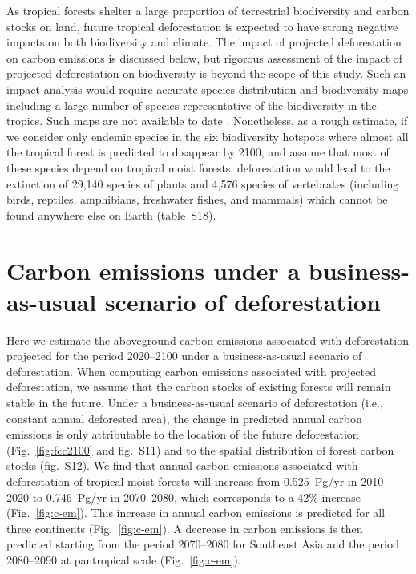 \documentclass[
  12pt,
]{article}
\begin{document}
As tropical forests shelter a large proportion of terrestrial biodiversity and carbon stocks on land, future tropical deforestation is expected to have strong negative impacts on both biodiversity and climate. The impact of projected deforestation on carbon emissions is discussed below, but rigorous assessment of the impact of projected deforestation on biodiversity is beyond the scope of this study. Such an impact analysis would require accurate species distribution and biodiversity maps including a large number of species representative of the biodiversity in the tropics. Such maps are not available to date \citep{Pimm2014}. Nonetheless, as a rough estimate, if we consider only endemic species \citep{Mittermeier2011} in the six biodiversity hotspots where almost all the tropical forest is predicted to disappear by 2100, and assume that most of these species depend on tropical moist forests, deforestation would lead to the extinction of 29,140 species of plants and 4,576 species of vertebrates (including birds, reptiles, amphibians, freshwater fishes, and mammals) which cannot be found anywhere else on Earth (table~S18).

\hypertarget{carbon-emissions-under-a-business-as-usual-scenario-of-deforestation}{%
\section{Carbon emissions under a business-as-usual scenario of deforestation}\label{carbon-emissions-under-a-business-as-usual-scenario-of-deforestation}}

Here we estimate the aboveground carbon emissions associated with deforestation projected for the period 2020--2100 under a business-as-usual scenario of deforestation. When computing carbon emissions associated with projected deforestation, we assume that the carbon stocks of existing forests will remain stable in the future. Under a business-as-usual scenario of deforestation (i.e., constant annual deforested area), the change in predicted annual carbon emissions is only attributable to the location of the future deforestation (Fig.~\ref{fig:fcc2100} and fig.~S11) and to the spatial distribution of forest carbon stocks (fig.~S12). We find that annual carbon emissions associated with deforestation of tropical moist forests will increase from 0.525~Pg/yr in 2010--2020 to 0.746~Pg/yr in 2070--2080, which corresponds to a 42\% increase (Fig.~\ref{fig:c-em}). This increase in annual carbon emissions is predicted for all three continents (Fig.~\ref{fig:c-em}). A decrease in carbon emissions is then predicted starting from the period 2070--2080 for Southeast Asia and the period 2080--2090 at pantropical scale (Fig.~\ref{fig:c-em}).\\
\end{document}
